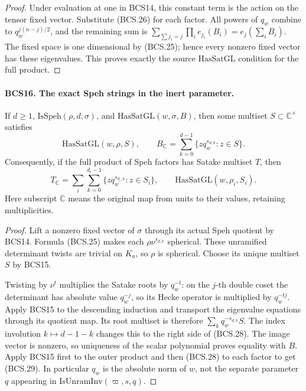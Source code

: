 \begin{proof}
Under evaluation at one in BCS14, this constant term is the action
on the tensor fixed vector.  Substitute (BCS.26) for each factor.
All powers of \(q_w\) combine to \(q_w^{j(n-j)/2}\), and the
remaining sum is
\(\sum_{\sum j_i=j}\prod_i e_{j_i}(B_i)=e_j(\sum_iB_i)\).
The fixed space is one dimensional by (BCS.25); hence every nonzero
fixed vector has these eigenvalues.  This proves exactly the source
\(\mathrm{HasSatGL}\) condition for the full product.
\end{proof}

\paragraph{BCS16. The exact Speh strings in the inert parameter.}
\label{claim:BCS16}
If \(d\ge1\), \(\mathrm{IsSpeh}(\rho,d,\sigma)\), and
\(\mathrm{HasSatGL}(w,\sigma,B)\), then some multiset
\(S\subset\mathbb C^\times\) satisfies
\[
 \mathrm{HasSatGL}(w,\rho,S),\qquad
 B_{\mathbb C}=\sum_{k=0}^{d-1}
                       \{zq_w^{s_{d,k}}:z\in S\}.
 \tag{BCS.28}
\]
Consequently, if the full product of Speh factors has Satake multiset
\(T\), then
\[
             T_{\mathbb C}=\sum_i\sum_{k=0}^{d_i-1}
                       \{zq_w^{s_{d_i,k}}:z\in S_i\},
 \qquad\mathrm{HasSatGL}(w,\rho_i,S_i).
 \tag{BCS.29}
\]
Here subscript \(\mathbb C\) means the original map from units
to their values, retaining multiplicities.
\begin{proof}
Lift a nonzero fixed vector of \(\sigma\) through its actual
Speh quotient by BCS14.  Formula (BCS.25) makes each
\(\rho\nu^{s_{d,k}}\) spherical.  These unramified determinant
twists are trivial on \(K_a\), so \(\rho\) is spherical.
Choose its unique multiset \(S\) by BCS15.

Twisting by \(\nu^t\) multiplies the Satake roots by
\(q_w^{-t}\): on the \(j\)-th double coset the determinant has
absolute value \(q_w^{-j}\), so its Hecke operator is multiplied
by \(q_w^{-tj}\).  Apply BCS15 to the descending induction and
transport the eigenvalue equations through its quotient map.  Its
root multiset is therefore \(\sum_k q_w^{-s_{d,k}}S\).
The index involution \(k\mapsto d-1-k\) changes this to the right
side of (BCS.28).  The image vector is nonzero, so uniqueness of the
scalar polynomial proves equality with \(B\).  Apply BCS15 first
to the outer product and then (BCS.28) to each factor to get
(BCS.29).  In particular \(q_w\) is the absolute norm of \(w\),
not the separate parameter \(q\) appearing in
\(\mathrm{IsUnramInv}(\varpi,s,q)\).
\end{proof}


